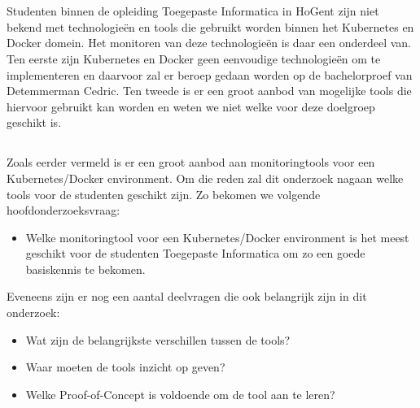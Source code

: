 
\chapter{}
\label{ch:inleiding}


\section{}
\label{sec:probleemstelling}

Studenten binnen de opleiding Toegepaste Informatica in HoGent zijn niet bekend met technologieën en tools die gebruikt worden binnen het Kubernetes en Docker domein. Het monitoren van deze technologieën is daar een onderdeel van. Ten eerste zijn Kubernetes en Docker geen eenvoudige technologieën om te implementeren en daarvoor zal er beroep gedaan worden op de bachelorproef van Detemmerman Cedric. Ten tweede is er een groot aanbod van mogelijke tools die hiervoor gebruikt kan worden en weten we niet welke voor deze doelgroep geschikt is.


\section{}
\label{sec:onderzoeksvraag}

Zoals eerder vermeld is er een groot aanbod aan monitoringtools voor een Kubernetes/Docker environment. Om die reden zal dit onderzoek nagaan welke tools voor de studenten geschikt zijn. Zo bekomen we volgende hoofdonderzoeksvraag:

\begin{itemize}
    \item Welke monitoringtool voor een Kubernetes/Docker environment is het meest geschikt voor de studenten Toegepaste Informatica om zo een goede basiskennis te bekomen.
\end{itemize}

Eveneens zijn er nog een aantal deelvragen die ook belangrijk zijn in dit onderzoek:

\begin{itemize}
    \item Wat zijn de belangrijkste verschillen tussen de tools?
    \item Waar moeten de tools inzicht op geven?
    \item Welke Proof-of-Concept is voldoende om de tool aan te leren?
\end{itemize}

